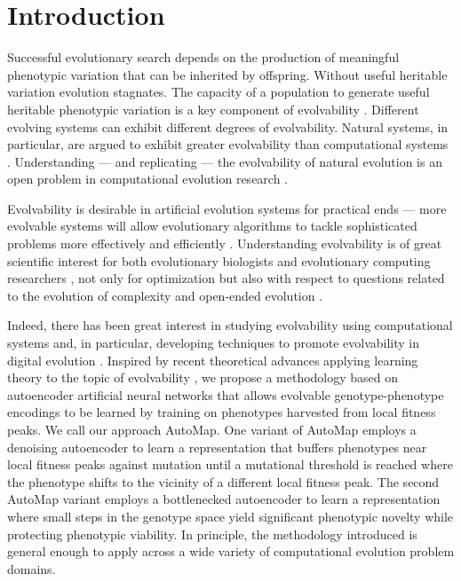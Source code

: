 \section{Introduction} \label{sec:introduction}

Successful evolutionary search depends on the production of meaningful phenotypic variation that can be inherited by offspring.
Without useful heritable variation evolution stagnates.
The capacity of a population to generate useful heritable phenotypic variation is a key component of evolvability \cite{tarapore2015evolvability}.
Different evolving systems can exhibit different degrees of evolvability.
Natural systems, in particular, are argued to exhibit greater evolvability than computational systems \cite{wagner1996perspective}.
Understanding --- and replicating --- the evolvability of natural evolution is an open problem in computational evolution research \cite{mengistu2016evolvability}.

Evolvability is desirable in artificial evolution systems for practical ends --- more evolvable systems will allow evolutionary algorithms to tackle sophisticated problems more effectively and efficiently \cite{bentley1999three, reisinger2007acquiring}.
Understanding evolvability is of great scientific interest for both evolutionary biologists and evolutionary computing researchers \cite{mengistu2016evolvability, pigliucci2008evolvability}, not only for optimization but also with respect to questions related to the evolution of complexity and open-ended evolution \cite{kirschner1998evolvability, hu2010evolvability}.

Indeed, there has been great interest in studying evolvability using computational systems and, in particular, developing techniques to promote evolvability in digital evolution \cite{kashtan2005spontaneous, mengistu2016evolvability, reisinger2005towards, cheney2013unshackling, nguyen2015innovation, lehman2013evolvability}.
Inspired by recent theoretical advances applying learning theory to the topic of evolvability \cite{kouvaris2017evolution, watson2016can}, we propose a methodology based on autoencoder artificial neural networks that allows evolvable genotype-phenotype encodings to be learned by training on phenotypes harvested from local fitness peaks.
We call our approach AutoMap.
One variant of AutoMap employs a denoising autoencoder to learn a representation that buffers phenotypes near local fitness peaks against mutation until a mutational threshold is reached where the phenotype shifts to the vicinity of a different local fitness peak.
The second AutoMap variant employs a bottlenecked autoencoder to learn a representation where small steps in the genotype space yield significant phenotypic novelty while protecting phenotypic viability.
In principle, the methodology introduced is general enough to apply across a wide variety of computational evolution problem domains.
